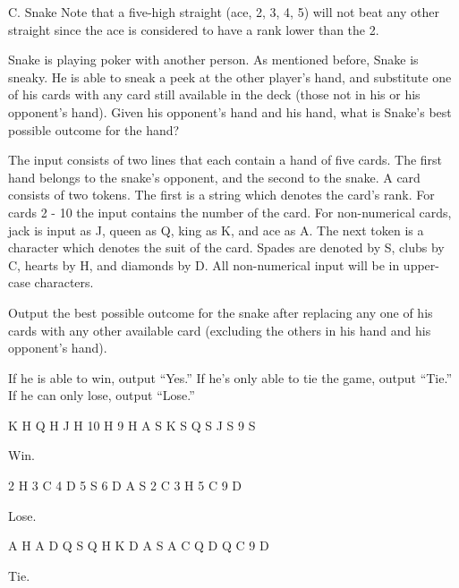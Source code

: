 \begin{problem}{C. Snake}
 Note that a five-high straight (ace, 2, 3, 4, 5) will not beat any other straight since the ace is considered to have a rank lower than the 2.
 
 Snake is playing poker with another person. As mentioned before, Snake is sneaky. He is able to sneak a peek at the other player's hand, and substitute one of his cards with any card still available in the deck (those not in his or his opponent's hand). Given his opponent's hand and his hand, what is Snake's best possible outcome for the hand?

\end{problem}

\begin{formalin}
The input consists of two lines that each contain a hand of five cards. 
The first hand belongs to the snake's opponent, and the second to the snake.
A card consists of two tokens. The first is a string which denotes the card's rank. 
For cards 2 - 10 the input contains the number of the card. For non-numerical cards, 
jack is input as J, queen as Q, king as K, and ace as A. The next token is a character 
which denotes the suit of the card. Spades are denoted by S, clubs by C, hearts by H, 
and diamonds by D. All non-numerical input will be in upper-case characters.
\end{formalin}

\begin{formalout}
Output the best possible outcome for the snake after replacing any one of his cards with 
any other available card (excluding the others in his hand and his opponent's hand). 

If he is able to win, output ``Yes.''
If he's only able to tie the game, output ``Tie.''
If he can only lose, output ``Lose.''
\end{formalout}

\begin{datain}
K H Q H J H 10 H 9 H
A S K S Q S J S 9 S
\end{datain}
\begin{dataout}
Win.
\end{dataout}

\begin{datain}
2 H 3 C 4 D 5 S 6 D
A S 2 C 3 H 5 C 9 D
\end{datain}
\begin{dataout}
Lose.
\end{dataout}

\begin{datain}
A H A D Q S Q H K D
A S A C Q D Q C 9 D
\end{datain}
\begin{dataout}
Tie.
\end{dataout}